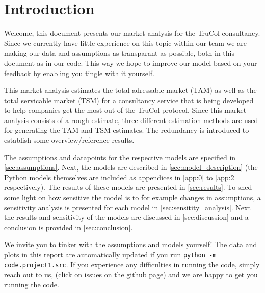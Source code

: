 \section{Introduction}\label{sec:intro}
Welcome, this document presents our market analysis for the TruCol consultancy. Since we currently have little experience on this topic within our team we are making our data and assumptions as transparant as possible, both in this document as in our code. This way we hope to improve our model based on your feedback by enabling you tingle with it yourself.

This market analysis estimates the total adressable market (TAM) as well as the total servicable market (TSM) for a consultancy service that is being developed to help companies get the most out of the TruCol protocol. Since this market analysis consists of a rough estimate, three different estimation methods are used for generating the TAM and TSM estimates. The redundancy is introduced to establish some overview/reference results.

The assumptions and datapoints for the respective models are specified in \cref{sec:assumptions}. Next, the models are described in \cref{sec:model_description} (the Python models themselves are included as appendices in \cref{app:0} to \cref{app:2} respectively). The results of these models are presented in \cref{sec:results}. To shed some light on how sensitive the model is to for example changes in assumptions, a sensitivity analysis is presented for each model in \cref{sec:sensitity_analysis}. Next the results and sensitivity of the models are discussed in \cref{sec:discussion} and a conclusion is provided in \cref{sec:conclusion}.

We invite you to tinker with the assumptions and models yourself! The data and plots in this report are automatically updated if you run \verb+python -m code.project1.src+. If you experience any difficulties in running the code, simply reach out to us, (click on issues on the github page) and we are happy to get you running the code.
